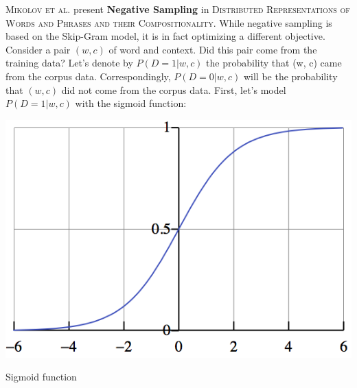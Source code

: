 \documentclass[nobib]{tufte-handout}
\begin{document}
\textsc{Mikolov et al.} present \textbf{Negative Sampling} in \textsc{Distributed Representations of Words and Phrases and their Compositionality}. While negative sampling is based on the Skip-Gram model, it is in fact optimizing a different objective. Consider a pair $(w, c)$ of word and context. Did this pair come from the training data? Let's denote by $P(D = 1|w, c)$ the probability that (w, c) came from the corpus data. Correspondingly, $P(D = 0|w, c)$ will be the probability that $(w, c)$ did not come from the corpus data. First, let's model $P(D = 1|w, c)$ with the sigmoid function:
\begin{marginfigure}%
  \includegraphics[width = \linewidth]{sigmoid}
  \caption{Sigmoid function}
    \label{fig:sigmoid}
\end{marginfigure}
\end{document}

